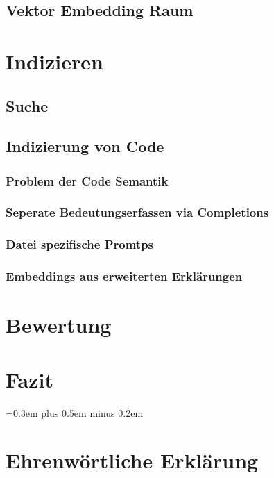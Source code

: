 \documentclass[
	12pt, %
	a4paper,
	bibliography=totoc, %
	numbers=noenddot, %
	ngerman, %
	headsepline, %
	oneside %
	]{scrbook} %
\begin{document}
\section{Vektor Embedding Raum}


\chapter{Indizieren}

\section{Suche}

\section{Indizierung von Code}

\subsection{Problem der Code Semantik}

\subsection{Seperate Bedeutungserfassen via Completions}

\subsection{Datei spezifische Promtps}

\subsection{Embeddings aus erweiterten Erklärungen}


\chapter{Bewertung}


\chapter{Fazit}\label{ch:fazit}


\spaceskip=0.3em plus 0.5em minus 0.2em
\printbibliography


\chapter*{Ehrenwörtliche Erklärung}

\end{document}
